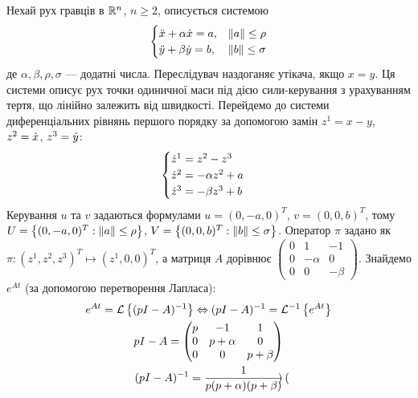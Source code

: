 \begin{example}\label{ex_4_3}
    Нехай рух гравців в $\mathbb{R}^n$, $n\geq 2$, описується системою
    \begin{gather*}
        \begin{cases}
            \ddot{x} + \alpha \dot{x} = a, & \left\Vert a \right\Vert \leq \rho \\
            \ddot{y} + \beta \dot{y} = b, & \left\Vert b \right\Vert \leq \sigma
        \end{cases}
    \end{gather*}
    де $\alpha, \beta, \rho, \sigma$ --- додатні числа. Переслідувач наздоганяє утікача, якщо $x=y$.
    Ця системи описує рух точки одиничної маси під дією сили-керування з урахуванням тертя,
    що лінійно залежить від швидкості.
    Перейдемо до системи диференціальних рівнянь першого порядку за допомогою замін $z^1 = x - y$, $z^2 = \dot{x}$, $z^3 = \dot{y}$:
    \begin{gather*}
        \begin{cases}
            \dot{z}^1 = z^2 - z^3 \\
            \dot{z}^2 = -\alpha z^2 + a \\
            \dot{z}^3 = -\beta z^3 + b
        \end{cases}
    \end{gather*}
    Керування $u$ та $v$ задаються формулами $u = (0, -a, 0)^T$, $v = (0, 0, b)^T$, тому
    $U = \left\{(0, -a, 0)^T : \left\Vert a \right\Vert \leq \rho \right\}$, $V = \left\{(0, 0, b)^T : \left\Vert b \right\Vert \leq \sigma \right\}$.
    Оператор $\pi$ задано як $\pi: (z^1, z^2, z^3)^T \mapsto (z^1, 0, 0)^T$, а матриця $A$
    дорівнює $\begin{pmatrix}
        0 & 1 & -1 \\
        0 & -\alpha & 0 \\
        0 & 0 & -\beta
    \end{pmatrix}$. Знайдемо $e^{A t}$ (за допомогою перетворення Лапласа):
    \begin{gather*}
        e^{At} = \mathcal{L}\left\{(pI - A)^{-1}\right\} \Leftrightarrow (pI - A)^{-1} = \mathcal{L}^{-1}\left\{e^{At}\right\} \\
        pI - A = \begin{pmatrix}
            p & -1 & 1 \\
            0 & p+\alpha & 0 \\
            0 & 0 & p + \beta \\
        \end{pmatrix} \\
        (pI - A)^{-1} = \frac{1}{p(p+\alpha)(p+\beta)}\begin{pmatrix}

\end{pmatrix}
\end{gather*}
\end{example}
